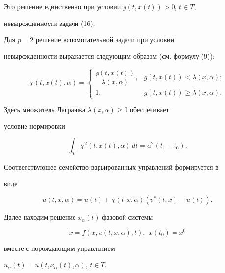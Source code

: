 Это решение единственно при условии $g(t, x(t)) > 0$, $t \in T$,


невырожденности задачи (16).





Для $p = 2$ решение вспомогательной задачи при условии


невырожденности выражается следующим образом (см. формулу (9)):


$$




\chi(t, x(t), \alpha) =


\begin{cases}


\dfrac{g(t, x(t))}{\lambda(x,\alpha)}, &


g(t, x(t)) < \lambda(x, \alpha); \\[3mm]


1, & g(t, x(t)) \geq \lambda(x, \alpha).


\end{cases}




$$


Здесь множитель Лагранжа $\lambda(x, \alpha) \geq 0$ обеспечивает


условие нормировки


$$


\int_{T} \chi^{2}(t, x(t), \alpha) \,dt = \alpha^{2}(t_{1} - t_{0}).


$$


Соответствующее семейство варьированных управлений формируется в


виде


\begin{equation}


u(t, x, \alpha) = u(t) + \chi(t, x, \alpha)(v^{*}(t, x) - u(t)).


\end{equation}


Далее находим решение $x_{\alpha}(t)$ фазовой системы


\begin{equation}


\Dot{x} = f(x, u(t, x, \alpha), t),\ \ x(t_{0}) = x^{0}


\end{equation}


вместе с порождающим управлением


$u_{\alpha}(t) = u(t, x_{\alpha}(t), \alpha)$, $t \in T$.



